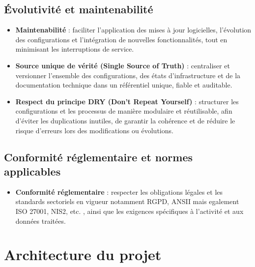 \subsection{Évolutivité et maintenabilité}

\begin{itemize}
	\item \textbf{Maintenabilité} : faciliter l'application des mises à jour logicielles, l'évolution des configurations et l'intégration de nouvelles fonctionnalités, tout en minimisant les interruptions de service.

	\item \textbf{Source unique de vérité (Single Source of Truth)} : centraliser et versionner l'ensemble des configurations, des états d'infrastructure et de la documentation technique dans un référentiel unique, fiable et auditable.

	\item \textbf{Respect du principe DRY (Don’t Repeat Yourself)} : structurer les configurations et les processus de manière modulaire et réutilisable, afin d'éviter les duplications inutiles, de garantir la cohérence et de réduire le risque d'erreurs lors des modifications ou évolutions.

\end{itemize}

\subsection{Conformité réglementaire et normes applicables}

\begin{itemize}
	\item \textbf{Conformité réglementaire} : respecter les obligations légales et les standards sectoriels en vigueur notamment RGPD, ANSII mais egalement ISO 27001, NIS2, etc. , ainsi que les exigences spécifiques à l'activité et aux données traitées.
\end{itemize}

\section{Architecture du projet}

